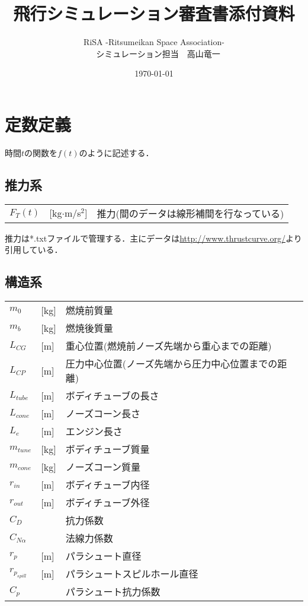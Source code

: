 \documentclass{jsarticle}
\title{飛行シミュレーション審査書添付資料}
\author{RiSA -Ritsumeikan Space Association- \\　シミュレーション担当　高山竜一}
\date{\today}
\begin{document}
\maketitle

\section{定数定義}
時間$t$の関数を$f(t)$のように記述する．

\subsection{推力系}
\begin{tabular}{lll}
$ F_T(t)$ &[kg$\cdot$m/s$^2$] &推力(間のデータは線形補間を行なっている) \\
\end{tabular}

推力は*.txtファイルで管理する．主にデータは\url{http://www.thrustcurve.org/}より引用している．

\subsection{構造系}
\begin{tabular}{lll}
$m_0$ &[kg]&燃焼前質量\\
$m_b$ &[kg]&燃焼後質量\\
$L_{CG}$ &[m]&重心位置(燃焼前ノーズ先端から重心までの距離)\\
$L_{CP}$ &[m]&圧力中心位置(ノーズ先端から圧力中心位置までの距離)\\
$L_{tube}$ &[m]&ボディチューブの長さ \\
$L_{cone}$ &[m]&ノーズコーン長さ \\
$L_{e}$ &[m]&エンジン長さ \\
$m_{tune}$ &[kg]&ボディチューブ質量\\
$m_{cone}$ &[kg]&ノーズコーン質量\\
$r_{in}$ &[m]&ボディチューブ内径\\
$r_{out}$ &[m]&ボディチューブ外径\\
$C_D$ &&抗力係数\\
$C_{N \alpha}$ &&法線力係数\\
$r_p$ &[m]&パラシュート直径\\
$r_p_{spill}$ &[m]&パラシュートスピルホール直径\\
$C_p$ &&パラシュート抗力係数\\
\end{tabular}
\end{document}
